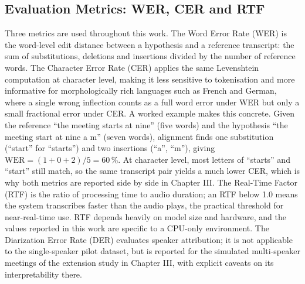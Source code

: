 \documentclass[12pt]{report}
\begin{document}
\subsection{Evaluation Metrics: WER, CER and RTF}
Three metrics are used throughout this work. The Word Error Rate (WER) is the word-level edit distance between a hypothesis and a reference transcript: the sum of substitutions, deletions and insertions divided by the number of reference words. The Character Error Rate (CER) applies the same Levenshtein computation at character level, making it less sensitive to tokenisation and more informative for morphologically rich languages such as French and German, where a single wrong inflection counts as a full word error under WER but only a small fractional error under CER.
A worked example makes this concrete. Given the reference \enquote{the meeting starts at nine} (five words) and the hypothesis \enquote{the meeting start at nine a m} (seven words), alignment finds one substitution (\enquote{start} for \enquote{starts}) and two insertions (\enquote{a}, \enquote{m}), giving $\mathrm{WER} = (1+0+2)/5 = 60\,\%$. At character level, most letters of \enquote{starts} and \enquote{start} still match, so the same transcript pair yields a much lower CER, which is why both metrics are reported side by side in Chapter III.
The Real-Time Factor (RTF) is the ratio of processing time to audio duration; an RTF below 1.0 means the system transcribes faster than the audio plays, the practical threshold for near-real-time use. RTF depends heavily on model size and hardware, and the values reported in this work are specific to a CPU-only environment. The Diarization Error Rate (DER) evaluates speaker attribution; it is not applicable to the single-speaker pilot dataset, but is reported for the simulated multi-speaker meetings of the extension study in Chapter III, with explicit caveats on its interpretability there.
\end{document}

